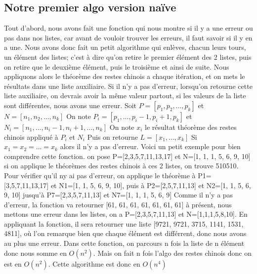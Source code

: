 \documentclass[a4paper, 11pt]{article}
\begin{document}
\subsection{Notre premier algo version naïve }
Tout d'abord, nous avons fait une fonction qui nous montre si il y a une erreur ou pas dans nos listes, car avant de vouloir trouver les erreurs, il faut savoir si il y en a une.
Nous avons donc fait un petit algorithme qui enlèves, chacun leurs tours, un élément des listes; c'est à dire qu'on retire le premier élément des 2 listes, puis on retire que le deuxième élément, puis le troisième et ainsi de suite. Nous appliquons alors le théorème des restes chinois a chaque itération, et on mets le résultats dans une liste auxiliaire. Si il n'y a pas d'erreur,
lorsqu'on retourne cette liste auxiliaire, on devrais avoir la même valeur partout, si les valeurs de la liste sont différentes, nous avons une erreur. \newline
\newline
Soit $P=[p_1 , p_2, ... , p_k]$ et $N=[n_1, n_2, ..., n_k]$ \newline
On note $P_i = [p_1,..., p_i-1, p_i+1, p_k]$ et $N_i=[n_1,..., n_i-1, n_i+1, ... , n_k]$ \newline
On note $x_i$ le résultat théorème des restes chinois appliqué à $P_i$ et $N_i$ \newline
Puis on retourne 
$L=[x_1, ..., x_k]$ \newline
Si 
$x_1=x_2=...=x_k$ 
alors il n'y a pas d'erreur.
\newline
Voici un petit exemple pour bien comprendre cette fonction.\newline
on pose P=[2,3,5,7,11,13,17] et N=[1, 1, 1, 5, 6, 9, 10] \newline
si on applique le théorèmes des restes chinois à ces 2 listes, on trouve 510510. Pour vérifier qu'il ny ai pas d'erreur, on applique le théorème à
P1=[3,5,7,11,13,17] et N1=[1, 1, 5, 6, 9, 10], puis à P2=[2,5,7,11,13] et N2=[1, 1, 5, 6, 9, 10] jusqu'à P7=[2,3,5,7,11,13] et N7=[1, 1, 1, 5, 6, 9]\newline
Comme il n'y a pas d'erreur, la fonction va retourner [61, 61, 61, 61, 61, 61, 61] \newline
à présent, nous mettons une erreur dans les listes, on a P=[2,3,5,7,11,13] et N=[1,1,1,5,8,10]. En appliquant la fonction, il sera retourner une liste [9721, 9721, 3715, 1141, 1531, 4811], où l'on remarque bien que chaque élément est différrent, donc nous avons au plus une erreur.
Dans cette fonction, on parcours n fois la liste de n élément donc nous somme en $O(n^2)$. Mais on fait n fois l'algo des restes chinois donc on est en $O(n^2)$. Cette algorithme est donc en $O(n^4)$
\end{document}
